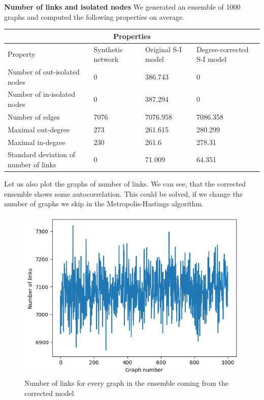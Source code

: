 \documentclass{article}
\begin{document}
\textbf{Number of links and isolated nodes}
We generated an ensemble of 1000 graphs and computed the following properties on average.
\begin{table}
\centering
\begin{tabular}{ |p{3cm}||p{3cm}|p{3cm}|p{3cm}|  }
 \hline
 \multicolumn{4}{|c|}{Properties} \\
 \hline
 Property & Synthetic network & Original  S-I model & Degree-corrected S-I model\\
 \hline
 Number of out-isolated nodes   & 0    &386.743&   0\\
 Number of in-isolated nodes   & 0    &387.294&   0\\
 Number of edges&   7076  & 7076.958   &7086.358\\
 Maximal out-degree &273 & 261.615& 280.299\\
 Maximal in-degree &230 & 261.6&  278.31\\
 Standard deviation of number of links &0 & 71.009&  64.351\\
 \hline
\end{tabular}
\end{table}

Let us also plot the graphs of number of links. We can see, that the corrected ensemble shows some autocorrelation. This could be solved, if we change the number of graphs we skip in the Metropolis-Hastings algorithm.


\begin{figure}[!ht]
    \centering
    \includegraphics[scale=0.4]{img/metropolis/corrected model/num_links_corrected.png}
    \caption{Number of links for every graph in the ensemble coming from the corrected model}
\end{figure}
\end{document}
